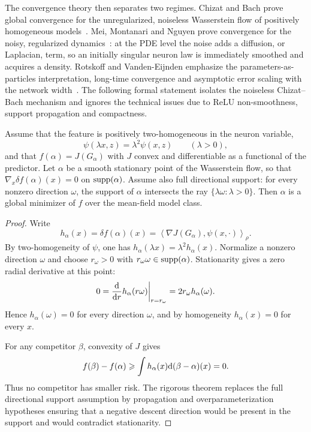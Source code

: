 The convergence theory then separates two regimes. Chizat and Bach prove global convergence for the unregularized, noiseless Wasserstein flow of positively homogeneous models~\cite{ChizatBach2018OverparameterizedOT}. Mei, Montanari and Nguyen prove convergence for the noisy, regularized dynamics~\cite{MeiMontanariNguyen2018MeanFieldNN}: at the PDE level the noise adds a diffusion, or Laplacian, term, so an initially singular neuron law is immediately smoothed and acquires a density. Rotskoff and Vanden-Eijnden emphasize the parameters-as-particles interpretation, long-time convergence and asymptotic error scaling with the network width~\cite{RotskoffVandenEijnden2018Trainability}. The following formal statement isolates the noiseless Chizat--Bach mechanism and ignores the technical issues due to ReLU non-smoothness, support propagation and compactness.

\begin{prop}\label{prop-formal-chizat-bach}
	Assume that the feature is positively two-homogeneous in the neuron variable,
	\[
		\psi(\lambda x,z)=\lambda^2\psi(x,z)
		\qquad(\lambda>0),
	\]
	and that $f(\alpha)=J(G_\alpha)$ with $J$ convex and differentiable as a functional of the predictor. Let $\alpha$ be a smooth stationary point of the Wasserstein flow, so that $\nabla_x\delta f(\alpha)(x)=0$ on $\operatorname{supp}(\alpha)$. Assume also full directional support: for every nonzero direction $\omega$, the support of $\alpha$ intersects the ray $\{\lambda\omega:\lambda>0\}$. Then $\alpha$ is a global minimizer of $f$ over the mean-field model class.
\end{prop}
\begin{proof}
	Write
	\[
		h_\alpha(x)=\delta f(\alpha)(x)
		=
		\left\langle \nabla J(G_\alpha),\psi(x,\cdot)\right\rangle_\rho .
	\]
	By two-homogeneity of $\psi$, one has $h_\alpha(\lambda x)=\lambda^2h_\alpha(x)$. Normalize a nonzero direction $\omega$ and choose $r_\omega>0$ with $r_\omega\omega\in\operatorname{supp}(\alpha)$. Stationarity gives a zero radial derivative at this point:
	\[
		0=\frac{\mathrm{d}}{\mathrm{d} r}h_\alpha(r\omega)\bigg|_{r=r_\omega}
		=2r_\omega h_\alpha(\omega).
	\]
	Hence $h_\alpha(\omega)=0$ for every direction $\omega$, and by homogeneity $h_\alpha(x)=0$ for every $x$.

	For any competitor $\beta$, convexity of $J$ gives
	\[
		f(\beta)-f(\alpha)
		\geqslant
		\int h_\alpha(x)\mathrm{d}(\beta-\alpha)(x)=0.
	\]
	Thus no competitor has smaller risk. The rigorous theorem replaces the full directional support assumption by propagation and overparameterization hypotheses ensuring that a negative descent direction would be present in the support and would contradict stationarity.
\end{proof}


